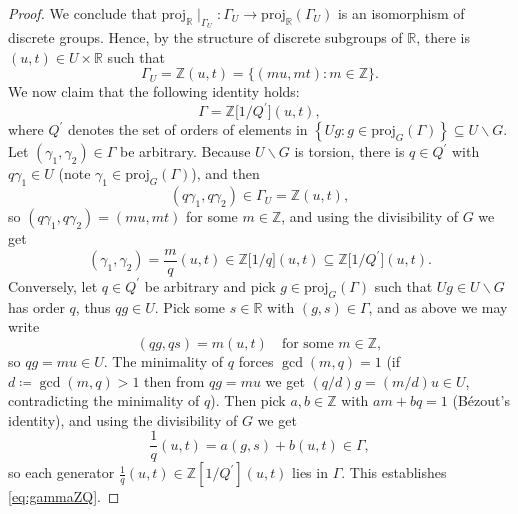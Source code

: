 \documentclass{amsart}
\numberwithin{equation}{subsection}
\theoremstyle{remark}
\begin{document}
\begin{proof}
We conclude that \(\mathrm{proj}_{\mathbb{R}}\mid_{\Gamma_{U}}:\Gamma_{U}\to\mathrm{proj}_{\mathbb{R}}\left(\Gamma_{U}\right)\) is an isomorphism of discrete groups. Hence, by the structure of discrete subgroups of \(\mathbb{R}\), there is \(\left(u,t\right)\in U\times\mathbb{R}\) such that
\[
\Gamma_{U}=\mathbb{Z}\left(u,t\right)=\bigl\{(mu,mt):m\in\mathbb{Z}\bigr\}.
\]
We now claim that the following identity holds:
\begin{equation}\label{eq:gammaZQ}
\Gamma=\mathbb{Z}\big[1/Q^{\prime}\big]\left(u,t\right),
\end{equation}
where \(Q^{\prime}\) denotes the set of orders of elements in \(\left\{Ug:g\in\mathrm{proj}_{G}\left(\Gamma\right)\right\}\subseteq U\backslash G\). Let \((\gamma_{1},\gamma_{2})\in\Gamma\) be arbitrary. Because \(U\backslash G\) is torsion, there is \(q\in Q^{\prime}\) with \(q\gamma_{1}\in U\) (note \(\gamma_{1}\in\mathrm{proj}_{G}\left(\Gamma\right)\)), and then
\[\left(q\gamma_{1},q\gamma_{2}\right)\in\Gamma_{U}=\mathbb{Z}\left(u,t\right),\]
so \(\left(q\gamma_{1},q\gamma_{2}\right)=\left(mu,mt\right)\) for some \(m\in\mathbb{Z}\), and using the divisibility of \(G\) we get
\[\left(\gamma_{1},\gamma_{2}\right)=\frac{m}{q}\left(u,t\right)\in\mathbb{Z}\big[1/q\big]\left(u,t\right)\subseteq\mathbb{Z}\big[1/Q^{\prime}\big]\left(u,t\right).\]
Conversely, let \(q\in Q^{\prime}\) be arbitrary and pick \(g\in\mathrm{proj}_{G}\left(\Gamma\right)\) such that \(Ug\in U\backslash G\) has order \(q\), thus \(qg\in U\). Pick some \(s\in\mathbb{R}\) with \(\left(g,s\right)\in\Gamma\), and as above we may write
\[\left(qg,qs\right)=m\left(u,t\right)\quad\text{for some }m\in\mathbb{Z},\]
so \(qg=mu\in U\). The minimality of \(q\) forces \(\gcd\left(m,q\right)=1\) (if \(d\coloneqq\gcd\left(m,q\right)>1\) then from \(qg=mu\) we get \(\left(q/d\right)g=\left(m/d\right)u\in U\), contradicting the minimality of \(q\)). Then pick \(a,b\in\mathbb{Z}\) with \(am+bq=1\) (B\'{e}zout's identity), and using the divisibility of \(G\) we get
\[\frac{1}{q}\left(u,t\right)=a\left(g,s\right)+b\left(u,t\right)\in\Gamma,\]
so each generator \(\frac{1}{q}\left(u,t\right)\in\mathbb{Z}\left[1/Q^{\prime}\right]\left(u,t\right)\) lies in \(\Gamma\). This establishes \eqref{eq:gammaZQ}.


\end{proof}
\end{document}
